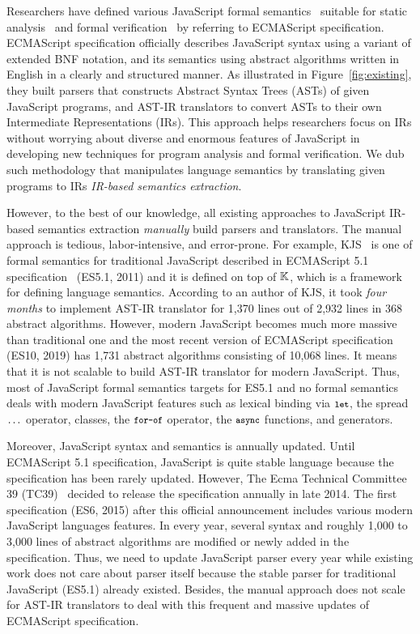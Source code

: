 Researchers have defined various JavaScript formal
semantics~\cite{aplas08,lambdajs,kjs,javert} suitable for static
analysis~\cite{jsai,tajs,wala,safe} and formal verification~\cite{javert} by
referring to ECMAScript specification.  ECMAScript specification officially
describes JavaScript syntax using a variant of extended BNF notation, and its
semantics using abstract algorithms written in English in a clearly and
structured manner.  As illustrated in Figure~\ref{fig:existing}, they built
parsers that constructs Abstract Syntax Trees (ASTs) of given JavaScript
programs, and AST-IR translators to convert ASTs to their own Intermediate
Representations (IRs). This approach helps researchers focus on IRs without
worrying about diverse and enormous features of JavaScript in developing new
techniques for program analysis and formal verification.  We dub such
methodology that manipulates language semantics by translating given programs to
IRs \textit{IR-based semantics extraction}.

However, to the best of our knowledge, all existing approaches to JavaScript
IR-based semantics extraction \textit{manually} build parsers and translators.
The manual approach is tedious, labor-intensive, and error-prone.  For example,
KJS~\cite{kjs} is one of formal semantics for traditional JavaScript described
in ECMAScript 5.1 specification~\cite{ecma5} (ES5.1, 2011) and it is defined on top of \(
\mathbb{K} \), which is a framework for defining language semantics.  According
to an author of KJS, it took \textit{four months} to implement AST-IR translator
for 1,370 lines out of 2,932 lines in 368 abstract algorithms. However, modern
JavaScript becomes much more massive than traditional one and the most recent
version of ECMAScript specification (ES10, 2019) has 1,731 abstract algorithms
consisting of 10,068 lines.  It means that it is not scalable to build AST-IR
translator for modern JavaScript.  Thus, most of JavaScript formal semantics
targets for ES5.1 and no formal semantics deals with modern JavaScript features
such as lexical binding via \( \texttt{\footnotesize let} \), the spread \( \texttt{\footnotesize...} \)
operator, classes, the \( \texttt{\footnotesize for-of} \) operator, the \( \texttt{\footnotesize async} \)
functions, and generators.

Moreover, JavaScript syntax and semantics is annually updated.  Until ECMAScript
5.1 specification, JavaScript is quite stable language because the specification
has been rarely updated.  However, The Ecma Technical Committee 39
(TC39)~\cite{tc39} decided to release the specification annually in late 2014.
The first specification (ES6, 2015) after this official announcement includes
various modern JavaScript languages features. In every year, several syntax and
roughly 1,000 to 3,000 lines of abstract algorithms are modified or newly added
in the specification. Thus, we need to update JavaScript parser every year while
existing work does not care about parser itself because the stable parser for
traditional JavaScript (ES5.1) already existed. Besides, the manual approach
does not scale for AST-IR translators to deal with this frequent and massive
updates of ECMAScript specification.

